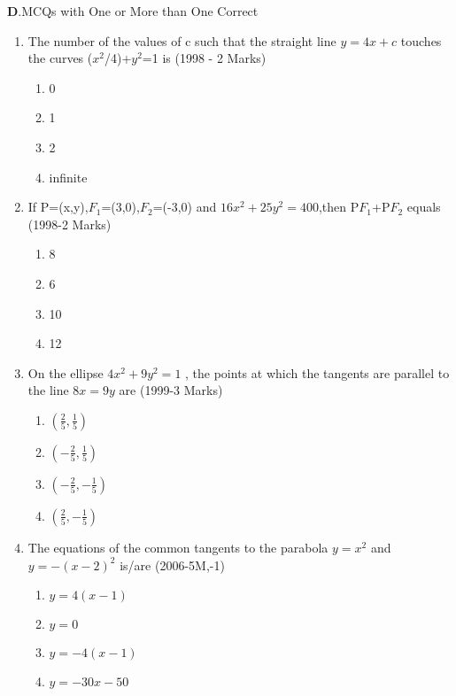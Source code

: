 \documentclass[journal,12pt,twocolumn]{IEEEtran}
\theoremstyle{remark}
\begin{document}
		\textbf{D}.MCQs with One or More than One Correct
		\vspace{0.5cm}
\begin{enumerate}
\item The number of the values of c such that the straight line $y=4x+c$ touches the curves ($x^2$/4)+$y^2$=1 is \hfill(1998 - 2 Marks)\\
	\begin{enumerate}
	\item 0
	\item 1
	\item 2
	\item infinite
	\end{enumerate}

\item If P=(x,y),$F_{1}$=(3,0),$F_{2}$=(-3,0) and $16x^2+25y^2=400$,then P$F_{1}$+P$F_{2}$ equals \hfill(1998-2 Marks)\\
	\begin{enumerate}
		\item 8
		\item 6
		\item 10
		\item 12
	\end{enumerate}

\item On the ellipse $4x^2+9y^2=1$ , the points at which the tangents are parallel to the line $8x=9y$ are \hfill(1999-3 Marks)\\
	\begin{enumerate}
		\item $\left(\frac{2}{5},\frac{1}{5}\right)$
		\item $\left(-\frac{2}{5},\frac{1}{5}\right)$
		\item $\left(-\frac{2}{5},-\frac{1}{5}\right)$
		\item $\left(\frac{2}{5},-\frac{1}{5}\right)$
	\end{enumerate}

\item The equations of the common tangents to the parabola $y=x^2$ and $y=-(x-2)^2$ is/are \hfill(2006-5M,-1)\\
	\begin{enumerate}
		\item $y=4(x-1)$
		\item $y=0$
		\item $y=-4(x-1)$
		\item $y=-30x-50$
	\end{enumerate}


\end{enumerate}
\end{document}
